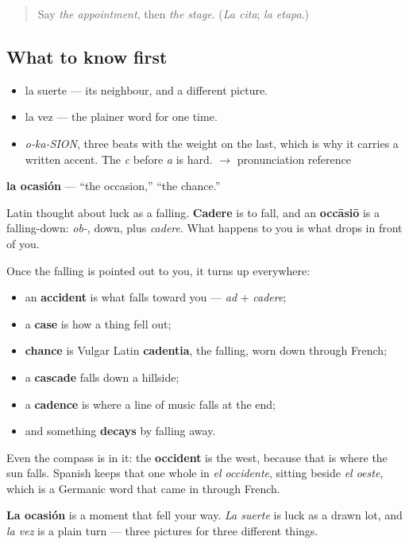 \label{lesson:ES-C356-ocasion}



\begin{quote}
Say \emph{the appointment}, then \emph{the stage}. (\emph{La cita}; \emph{la etapa}.)
\end{quote}

\subsection*{What to know first}
\begin{itemize}
\raggedright
  \item la suerte — its neighbour, and a different picture.
  \item la vez — the plainer word for one time.
\end{itemize}

\begin{sounds}
\begin{itemize}
\raggedright
  \item \emph{o-ka-SION}, three beats with the weight on the last, which is why it carries a written accent. The \emph{c} before \emph{a} is hard. $\to$ pronunciation reference
\end{itemize}
\end{sounds}

\begin{cousinweb}
\textbf{la ocasión} — \textquotedblleft{}the occasion,\textquotedblright{} \textquotedblleft{}the chance.\textquotedblright{}

Latin thought about luck as a falling. \textbf{Cadere} is to fall, and an \textbf{occāsiō} is a falling-down: \emph{ob-}, down, plus \emph{cadere}. What happens to you is what drops in front of you.

Once the falling is pointed out to you, it turns up everywhere:

\begin{itemize}
\raggedright
  \item an \textbf{accident} is what falls toward you — \emph{ad} + \emph{cadere};
  \item a \textbf{case} is how a thing fell out;
  \item \textbf{chance} is Vulgar Latin \textbf{cadentia}, the falling, worn down through French;
  \item a \textbf{cascade} falls down a hillside;
  \item a \textbf{cadence} is where a line of music falls at the end;
  \item and something \textbf{decays} by falling away.
\end{itemize}

Even the compass is in it: the \textbf{occident} is the west, because that is where the sun falls. Spanish keeps that one whole in \emph{el occidente}, sitting beside \emph{el oeste}, which is a Germanic word that came in through French.

\textbf{La ocasión} is a moment that fell your way. \emph{La suerte} is luck as a drawn lot, and \emph{la vez} is a plain turn — three pictures for three different things.
\end{cousinweb}


